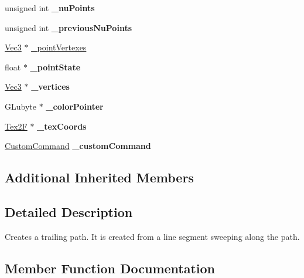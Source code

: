 \begin{DoxyCompactItemize}
unsigned int {\bfseries \+\_\+nu\+Points}
\item 
\mbox{\label{classMotionStreak3D_a762e1bfe2a3ea5462580ec49368328e6}} 
unsigned int {\bfseries \+\_\+previous\+Nu\+Points}
\item 
\hyperlink{classVec3}{Vec3} $\ast$ \hyperlink{classMotionStreak3D_ad06a526af1362cc3f9c4e4da850e4b9d}{\+\_\+point\+Vertexes}
\item 
\mbox{\label{classMotionStreak3D_a8d1016c40f905e435990e85939a49ecf}} 
float $\ast$ {\bfseries \+\_\+point\+State}
\item 
\mbox{\label{classMotionStreak3D_ab7fe027f690c1366fe93442f833e9b32}} 
\hyperlink{classVec3}{Vec3} $\ast$ {\bfseries \+\_\+vertices}
\item 
\mbox{\label{classMotionStreak3D_a3f75f586253cbfaba598ee64139a69a9}} 
G\+Lubyte $\ast$ {\bfseries \+\_\+color\+Pointer}
\item 
\mbox{\label{classMotionStreak3D_a13de4dcab53bf3f6450ccc8dcb7fa51c}} 
\hyperlink{structTex2F}{Tex2F} $\ast$ {\bfseries \+\_\+tex\+Coords}
\item 
\mbox{\label{classMotionStreak3D_a31091b957344f15244bfa2e9fbffc013}} 
\hyperlink{classCustomCommand}{Custom\+Command} {\bfseries \+\_\+custom\+Command}
\end{DoxyCompactItemize}
\subsection*{Additional Inherited Members}


\subsection{Detailed Description}
Creates a trailing path. It is created from a line segment sweeping along the path. 

\subsection{Member Function Documentation}
\mbox{\label{classMotionStreak3D_a2f965f35588cdb7611269b6e0d0f44a2}} 
